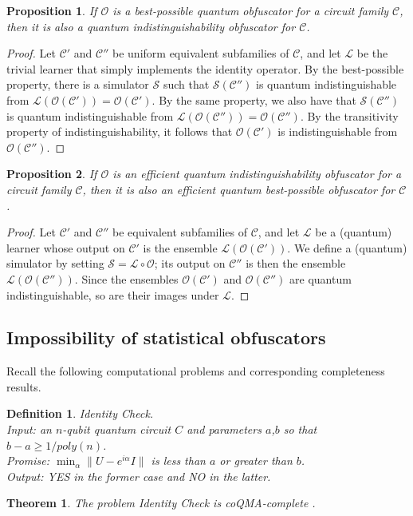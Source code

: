 \documentclass[11pt]{article}
\numberwithin{equation}{section}
\newtheorem{theorem}{Theorem}
\newtheorem{proposition}{Proposition}
\newtheorem{definition}{Definition}
\begin{document}
{\begin{proposition} If $\mathcal O$ is a best-possible quantum obfuscator for a circuit family $\mathcal C$, then it is also a quantum indistinguishability obfuscator for $\mathcal C$.
\end{proposition}
\begin{proof}
Let $\mathcal C'$ and $\mathcal C''$ be uniform equivalent subfamilies of $\mathcal C$, and let $\mathcal L$ be the trivial learner that simply implements the identity operator. By the best-possible property, there is a simulator $\mathcal S$ such that $\mathcal S(\mathcal C'')$ is quantum indistinguishable from $\mathcal L ( \mathcal O( \mathcal C')) = \mathcal O ( \mathcal C')$. By the same property, we also have that $\mathcal S(\mathcal C'')$ is quantum indistinguishable from $\mathcal L(\mathcal O (\mathcal C'')) = \mathcal O( \mathcal C'')$. By the transitivity property of indistinguishability, it follows that $\mathcal O(\mathcal C')$ is indistinguishable from $\mathcal O(\mathcal C'')$.
\end{proof}

\begin{proposition} If $\mathcal O$ is an efficient quantum indistinguishability obfuscator for a circuit family $\mathcal C$, then it is also an efficient quantum best-possible obfuscator for $\mathcal C$.
\end{proposition}
\begin{proof}
Let $\mathcal C'$ and $\mathcal C''$ be equivalent subfamilies of $\mathcal C$, and let $\mathcal L$ be a (quantum) learner whose output on $\mathcal C'$ is the ensemble $\mathcal L(\mathcal O (\mathcal C'))$. We define a (quantum) simulator by setting $\mathcal S = \mathcal L \circ \mathcal O$; its output on $\mathcal C''$ is then the ensemble $\mathcal L(\mathcal O(\mathcal C''))$. Since the ensembles $\mathcal O(\mathcal C')$ and $\mathcal O(\mathcal C'')$ are quantum indistinguishable, so are their images under $\mathcal L$.
\end{proof}
\subsection{Impossibility of statistical obfuscators}

Recall the following computational problems and corresponding completeness results.

\begin{definition} \emph{Identity Check.}\\
\indent Input: an $n$-qubit quantum circuit $C$ and parameters $a$,$b$ so that $b-a\geq 1/poly(n)$. \\
\indent Promise: $\min_\alpha \| U - e^{i \alpha} I \|$ is less than $a$ or greater than $b$.\\
\indent Output: YES in the former case and NO in the latter.
\end{definition}
\begin{theorem} 
The problem Identity Check is coQMA-complete \cite{JWB03}. 
\end{theorem}

}
\end{document}

